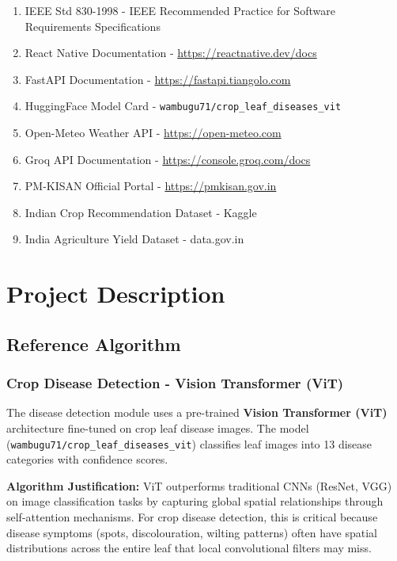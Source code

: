 \documentclass[12pt,a4paper]{article}
\begin{document}
\begin{enumerate}
    \item IEEE Std 830-1998 - IEEE Recommended Practice for Software Requirements Specifications
    \item React Native Documentation - \url{https://reactnative.dev/docs}
    \item FastAPI Documentation - \url{https://fastapi.tiangolo.com}
    \item HuggingFace Model Card - \texttt{wambugu71/crop\_leaf\_diseases\_vit}
    \item Open-Meteo Weather API - \url{https://open-meteo.com}
    \item Groq API Documentation - \url{https://console.groq.com/docs}
    \item PM-KISAN Official Portal - \url{https://pmkisan.gov.in}
    \item Indian Crop Recommendation Dataset - Kaggle
    \item India Agriculture Yield Dataset - data.gov.in
\end{enumerate}

\section{Project Description}

\subsection{Reference Algorithm}

\subsubsection{Crop Disease Detection - Vision Transformer (ViT)}
The disease detection module uses a pre-trained \textbf{Vision Transformer (ViT)} architecture fine-tuned on crop leaf disease images. The model (\texttt{wambugu71/crop\_leaf\_diseases\_vit}) classifies leaf images into 13 disease categories with confidence scores.

\textbf{Algorithm Justification:} ViT outperforms traditional CNNs (ResNet, VGG) on image classification tasks by capturing global spatial relationships through self-attention mechanisms. For crop disease detection, this is critical because disease symptoms (spots, discolouration, wilting patterns) often have spatial distributions across the entire leaf that local convolutional filters may miss.
\end{document}
